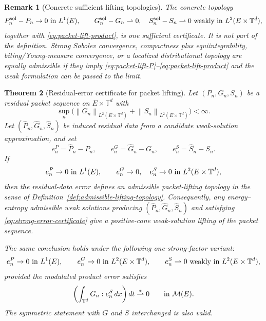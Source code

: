 \documentclass[11pt]{article}
\numberwithin{equation}{section}
\newtheorem{theorem}{Theorem}[section]
\newtheorem{remark}[theorem]{Remark}
\newcommand{\T}{\mathbb T}
\newcommand{\norm}[1]{\left\lVert #1\right\rVert}
\begin{document}
\begin{remark}[Concrete sufficient lifting topologies]
\label{rem:concrete-lifting-topologies}
The concrete topology
\[
  P_n^{\rm sol}-P_n\to0\hbox{ in }L^1(E),\qquad
  G_n^{\rm sol}-G_n\rightharpoonup0,\quad
  S_n^{\rm sol}-S_n\rightharpoonup0
  \hbox{ weakly in }L^2(E\times\T^d),
\]
together with \eqref{eq:packet-lift-product}, is one sufficient certificate.
It is not part of the definition.  Strong Sobolev convergence, compactness plus
equiintegrability, biting/Young-measure convergence, or a localized
distributional topology are equally admissible if they imply
\eqref{eq:packet-lift-P}--\eqref{eq:packet-lift-product} and the weak
formulation can be passed to the limit.
\end{remark}

\begin{theorem}[Residual-error certificate for packet lifting]
\label{thm:strong-error-lifting-certificate}
Let \((P_n,G_n,S_n)\) be a residual packet sequence on \(E\times\T^d\) with
\[
  \sup_n\bigl(\norm{G_n}_{L^2(E\times\T^d)}
  +\norm{S_n}_{L^2(E\times\T^d)}\bigr)<\infty .
\]
Let \((\widehat P_n,\widehat G_n,\widehat S_n)\) be induced residual data from
a candidate weak-solution approximation, and set
\[
  e^P_n=\widehat P_n-P_n,\qquad
  e^G_n=\widehat G_n-G_n,\qquad
  e^S_n=\widehat S_n-S_n .
\]
If
\begin{equation}
  e^P_n\to0\hbox{ in }L^1(E),\qquad
  e^G_n\to0,\quad e^S_n\to0
  \hbox{ in }L^2(E\times\T^d),
  \label{eq:strong-error-certificate}
\end{equation}
then the residual-data error defines an admissible packet-lifting topology in
the sense of Definition~\ref{def:admissible-lifting-topology}.  Consequently,
any energy--entropy admissible weak solutions producing
\((\widehat P_n,\widehat G_n,\widehat S_n)\) and satisfying
\eqref{eq:strong-error-certificate} give a positive-cone weak-solution lifting
of the packet sequence.

The same conclusion holds under the following one-strong-factor variant:
\[
  e^P_n\to0\hbox{ in }L^1(E),\qquad
  e^G_n\to0\hbox{ in }L^2(E\times\T^d),\qquad
  e^S_n\rightharpoonup0\hbox{ weakly in }L^2(E\times\T^d),
\]
provided the modulated product error satisfies
\begin{equation}
  \left(\int_{\T^d}G_n:e^S_n\,dx\right)dt
  \stackrel{*}{\rightharpoonup}0
  \qquad\hbox{in }\mathcal M(E).
  \label{eq:modulated-weak-annihilation}
\end{equation}
The symmetric statement with \(G\) and \(S\) interchanged is also valid.
\end{theorem}
\end{document}
